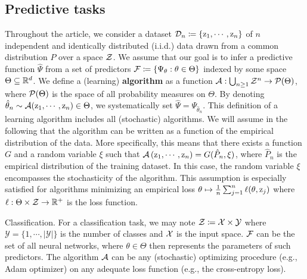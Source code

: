 
\subsection{Predictive tasks}
Throughout the article, we consider a dataset ${\mathcal{D}}_n\coloneqq\{{\textnormal{z}}_1,\cdots,{\textnormal{z}}_n\}$ of $n$ independent and identically distributed (i.i.d.) data drawn from a common distribution $P$ over a space ${\mathcal{Z}}$. We assume that our goal is to infer a predictive function $\hat{\Psi}$ from a set of predictors ${\mathcal{F}}\coloneqq\{\Psi_\theta : \theta\in\Theta\}$ indexed by some space $\Theta\subseteq\mathbb{R}^d$. We define a (learning) \textbf{algorithm} as a function ${\mathcal{A}}:\bigcup_{n\geq1}{\mathcal{Z}}^n\to{\mathcal{P}}(\Theta)$, where ${\mathcal{P}}(\Theta)$ is the space of all probability measures on $\Theta$. By denoting $\hat{\theta}_n\sim{\mathcal{A}}({\textnormal{z}}_1,\cdots,{\textnormal{z}}_n)\in\Theta$, we systematically set $\hat{\Psi} = \Psi_{\hat{\theta}_n}$.
This definition of a learning algorithm includes all (stochastic) algorithms. We will assume in the following that the algorithm can be written as a function of the empirical distribution of the data. More specifically, this means that there exists a function $G$ and a random variable $\xi$ such that ${\mathcal{A}}\left({\textnormal{z}}_1,\cdots,{\textnormal{z}}_n\right) = G(\hat{P}_n,\xi)$, where $\hat{P}_n$ is the empirical distribution of the training dataset. In this case, the random variable $\xi$ encompasses the stochasticity of the algorithm. This assumption is especially satisfied for algorithms minimizing an empirical loss $\theta\mapsto\frac{1}{n}\sum_{j=1}^{n}\ell (\theta,{\textnormal{z}}_j)$ where $\ell:\Theta\times{\mathcal{Z}}\to\mathbb{R}^+$ is the loss function.
\begin{example}{Classification.} For a classification task, we may note ${\mathcal{Z}}\coloneqq{\mathcal{X}}\times\mathcal{Y}$ where 
$\mathcal{Y}=\{1,\cdots,|\mathcal{Y}|\}$ is the number of classes and ${\mathcal{X}}$ is the input space. ${\mathcal{F}}$ can be the set of all neural networks, where $\theta\in\Theta$ then represents the parameters of such predictors. The algorithm ${\mathcal{A}}$ can be any (stochastic) optimizing procedure (e.g., Adam optimizer) on any adequate loss function (e.g., the cross-entropy loss).
\end{example}
